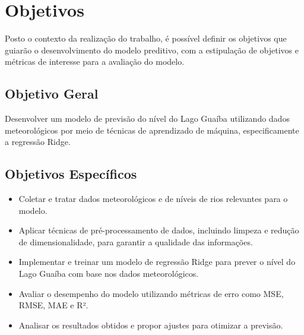 \section{Objetivos}

Posto o contexto da realização do trabalho, é possível definir os objetivos que guiarão o desenvolvimento do modelo preditivo, com a estipulação de objetivos e métricas de interesse para a avaliação do modelo.

\subsection{Objetivo Geral}

Desenvolver um modelo de previsão do nível do Lago Guaíba utilizando dados meteorológicos por meio de técnicas de aprendizado de máquina, especificamente a regressão Ridge.

\subsection{Objetivos Específicos}

\begin{itemize}
    \item Coletar e tratar dados meteorológicos e de níveis de rios relevantes para o modelo.
    \item Aplicar técnicas de pré-processamento de dados, incluindo limpeza e redução de dimensionalidade, para garantir a qualidade das informações.
    \item Implementar e treinar um modelo de regressão Ridge para prever o nível do Lago Guaíba com base nos dados meteorológicos.
    \item Avaliar o desempenho do modelo utilizando métricas de erro como MSE, RMSE, MAE e R².
    \item Analisar os resultados obtidos e propor ajustes para otimizar a previsão.
\end{itemize}
